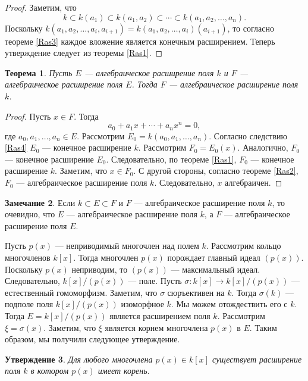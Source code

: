 \documentclass[12pt, titlepage, oneside]{amsbook}
\newtheorem{theorem}{Теорема}[chapter]
\newtheorem{claim}[theorem]{Утверждение}
\theoremstyle{definition}
\newtheorem{remark}[theorem]{Замечание}
\theoremstyle{remark}
\begin{document}
\begin{proof}
	Заметим, что $$k\subset k(a_1)\subset k(a_1,a_2)\subset\cdots \subset k(a_1,a_2,\ldots,a_n).$$ Поскольку $k(a_1,a_2,\ldots,a_i, a_{i+1})=k(a_1,a_2,\ldots,a_i)(a_{i+1})$, то согласно теореме \ref{Ras3} каждое вложение является конечным расширением. Теперь утверждение следует из теоремы \ref{Ras1}.
\end{proof}

\begin{theorem}
	\label{Ras5}
	Пусть $E$ --- алгебраическое расширение поля $k$ и $F$ --- алгебраическое расширение поля $E$. Тогда $F$ --- алгебраическое расширение поля $k$.
\end{theorem}

\begin{proof}
	Пусть $x\in F$. Тогда $$a_0+a_1x+\cdots+a_n x^n=0,$$ где $a_0,a_1,\ldots,a_n\in E$. Рассмотрим $E_0=k(a_0,a_1,\ldots,a_n)$. Согласно следствию \ref{Ras4} $E_0$ --- конечное расширение $k$. Рассмотрим $F_0=E_0(x)$. Аналогично, $F_0$ --- конечное расширение $E_0$. Следовательно, по теореме \ref{Ras1}, $F_0$ --- конечное расширение $k$. Заметим, что $x\in F_0$. С другой стороны, согласно теореме \ref{Ras2}, $F_0$ --- алгебраическое расширение поля $k$. Следовательно, $x$ алгебраичен.
\end{proof}

\begin{remark}
	Если $k\subset E\subset F$ и $F$ --- алгебраическое расширение поля $k$, то очевидно, что $E$ --- алгебраическое расширение поля $k$, а $F$ --- алгебраическое расширение поля $E$.
\end{remark}

Пусть $p(x)$ --- неприводимый многочлен над полем $k$. Рассмотрим кольцо многочленов $k[x]$. Тогда многочлен $p(x)$ порождает главный идеал $(p(x))$. Поскольку $p(x)$ неприводим, то $(p(x))$ --- максимальный идеал. Следовательно, $k[x]/(p(x))$ --- поле. Пусть $\sigma\colon k[x]\rightarrow k[x]/(p(x))$ --- естественный гомоморфизм. Заметим, что $\sigma$ сюръективен на $k$. Тогда $\sigma(k)$ --- подполе поля $k[x]/(p(x))$ изоморфное $k$. Мы можем отождествить его с $k$. Тогда $E=k[x]/(p(x))$ является расширением поля $k$. Рассмотрим $\xi=\sigma(x)$. Заметим, что $\xi$ является корнем многочлена  $p(x)$ в $E$. Таким образом, мы получили следующее утверждение.

\begin{claim}
	\label{Nor1}
	Для любого многочлена $p(x)\in k[x]$ существует расширение поля $k$ в котором $p(x)$ имеет корень.
\end{claim}
\end{document}
